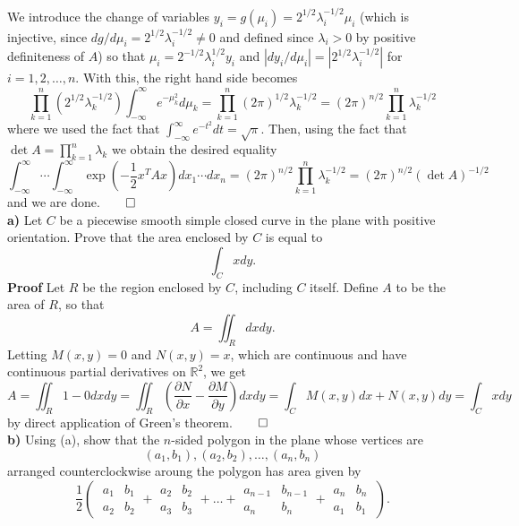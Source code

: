 \documentclass[11pt, letterpaper]{article}
\newcommand{\mbb}[1]{\mathbb{#1}}
\begin{document}
    We introduce the change of variables $y_i=g(\mu_i)=2^{1/2}\lambda_i^{-1/2}\mu_i$ (which is injective, since $dg/d\mu_i=2^{1/2}\lambda_i^{-1/2}\neq 0$ and defined since $\lambda_i>0$ by positive definiteness of $A$) so that $\mu_i=2^{-1/2}\lambda_i^{1/2}y_i$ and $|dy_i/d\mu_i|=|2^{1/2}\lambda_i^{-1/2}|$ for $i=1,2,\dots,n$. With this, the right hand side becomes
    \[\prod_{k=1}^n(2^{1/2}\lambda_k^{-1/2})\int_{-\infty}^\infty e^{-\mu_k^2}d\mu_k=\prod_{k=1}^n(2\pi)^{1/2}\lambda_k^{-1/2}=(2\pi)^{n/2}\prod_{k=1}^n\lambda_k^{-1/2}\]
    where we used the fact that $\int_{-\infty}^\infty e^{-t^2}dt=\sqrt{\pi}$. Then, using the fact that $\det A=\prod_{k=1}^n\lambda_k$ we obtain the desired equality
    \[\int_{-\infty}^\infty\cdots\int_{-\infty}^\infty\exp\left(-\frac{1}{2}x^TAx\right)dx_1\cdots dx_n=(2\pi)^{n/2}\prod_{k=1}^n\lambda_k^{-1/2}=(2\pi)^{n/2}(\det A)^{-1/2}\]
    and we are done.\hfill{$\qed$}\newpage
    \\[10pt]
    {\bf a)} Let $C$ be a piecewise smooth simple closed curve in the plane with positive orientation. Prove that the area enclosed by $C$ is equal to
    \[\int_Cxdy.\]
    {\bf Proof} Let $R$ be the region enclosed by $C$, including $C$ itself. Define $A$ to be the area of $R$, so that
    \[A=\iint_Rdxdy.\]
    Letting $M(x,y)=0$ and $N(x,y)=x$, which are continuous and have continuous partial derivatives on $\mbb{R}^2$, we get
    \[A=\iint_R1-0dxdy=\iint_R\left(\frac{\partial N}{\partial x}-\frac{\partial M}{\partial y}\right)dxdy=\int_C M(x,y)dx+N(x,y)dy=\int_Cxdy\]
    by direct application of Green's theorem.\hfill{$\qed$}\\[10pt]
    {\bf b)} Using (a), show that the $n$-sided polygon in the plane whose vertices are 
    \[(a_1,b_1),(a_2,b_2),\dots,(a_n,b_n)\]
    arranged counterclockwise aroung the polygon has area given by
    \[\frac{1}{2}\left(\;\begin{array}{|cc|}
        a_1 & b_1\\
        a_2 & b_2
    \end{array}+\begin{array}{|cc|}
        a_2 & b_2\\
        a_3 & b_3
    \end{array}+\dots +\begin{array}{|cc|}
        a_{n-1} & b_{n-1}\\
        a_n & b_n
    \end{array}+\begin{array}{|cc|}
        a_n & b_n\\
        a_1 & b_1
    \end{array}\;
    \right).\]
\end{document}
